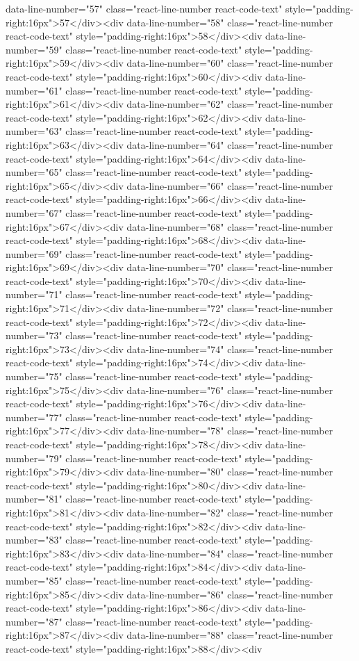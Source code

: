 data-line-number="57" class="react-line-number react-code-text" style="padding-right:16px">57</div><div data-line-number="58" class="react-line-number react-code-text" style="padding-right:16px">58</div><div data-line-number="59" class="react-line-number react-code-text" style="padding-right:16px">59</div><div data-line-number="60" class="react-line-number react-code-text" style="padding-right:16px">60</div><div data-line-number="61" class="react-line-number react-code-text" style="padding-right:16px">61</div><div data-line-number="62" class="react-line-number react-code-text" style="padding-right:16px">62</div><div data-line-number="63" class="react-line-number react-code-text" style="padding-right:16px">63</div><div data-line-number="64" class="react-line-number react-code-text" style="padding-right:16px">64</div><div data-line-number="65" class="react-line-number react-code-text" style="padding-right:16px">65</div><div data-line-number="66" class="react-line-number react-code-text" style="padding-right:16px">66</div><div data-line-number="67" class="react-line-number react-code-text" style="padding-right:16px">67</div><div data-line-number="68" class="react-line-number react-code-text" style="padding-right:16px">68</div><div data-line-number="69" class="react-line-number react-code-text" style="padding-right:16px">69</div><div data-line-number="70" class="react-line-number react-code-text" style="padding-right:16px">70</div><div data-line-number="71" class="react-line-number react-code-text" style="padding-right:16px">71</div><div data-line-number="72" class="react-line-number react-code-text" style="padding-right:16px">72</div><div data-line-number="73" class="react-line-number react-code-text" style="padding-right:16px">73</div><div data-line-number="74" class="react-line-number react-code-text" style="padding-right:16px">74</div><div data-line-number="75" class="react-line-number react-code-text" style="padding-right:16px">75</div><div data-line-number="76" class="react-line-number react-code-text" style="padding-right:16px">76</div><div data-line-number="77" class="react-line-number react-code-text" style="padding-right:16px">77</div><div data-line-number="78" class="react-line-number react-code-text" style="padding-right:16px">78</div><div data-line-number="79" class="react-line-number react-code-text" style="padding-right:16px">79</div><div data-line-number="80" class="react-line-number react-code-text" style="padding-right:16px">80</div><div data-line-number="81" class="react-line-number react-code-text" style="padding-right:16px">81</div><div data-line-number="82" class="react-line-number react-code-text" style="padding-right:16px">82</div><div data-line-number="83" class="react-line-number react-code-text" style="padding-right:16px">83</div><div data-line-number="84" class="react-line-number react-code-text" style="padding-right:16px">84</div><div data-line-number="85" class="react-line-number react-code-text" style="padding-right:16px">85</div><div data-line-number="86" class="react-line-number react-code-text" style="padding-right:16px">86</div><div data-line-number="87" class="react-line-number react-code-text" style="padding-right:16px">87</div><div data-line-number="88" class="react-line-number react-code-text" style="padding-right:16px">88</div><div 